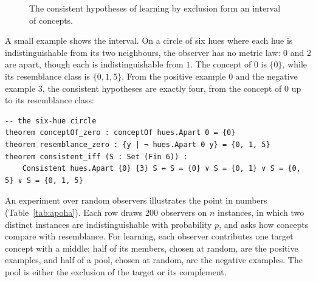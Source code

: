 \documentclass[11pt]{article}
\theoremstyle{plain}
\theoremstyle{definition}
\begin{document}
\begin{figure}[ht]
\centering
{}
\caption{The consistent hypotheses of learning by exclusion form an interval of concepts.}
\label{fig:apoha}
\end{figure}

\noindent A small example shows the interval. On a circle of six hues where each hue is
indistinguishable from its two neighbours, the observer has no metric law: $0$ and $2$ are
apart, though each is indistinguishable from $1$. The concept of $0$ is $\{0\}$, while its
resemblance class is $\{0,1,5\}$. From the positive example $0$ and the negative example $3$,
the consistent hypotheses are exactly four, from the concept of $0$ up to its resemblance
class:

\begin{lstlisting}
-- the six-hue circle
theorem conceptOf_zero : conceptOf hues.Apart 0 = {0}
theorem resemblance_zero : {y | ¬ hues.Apart 0 y} = {0, 1, 5}
theorem consistent_iff (S : Set (Fin 6)) :
    Consistent hues.Apart {0} {3} S ↔ S = {0} ∨ S = {0, 1} ∨ S = {0, 5} ∨ S = {0, 1, 5}
\end{lstlisting}

An experiment over random observers illustrates the point in numbers
(Table~\ref{tab:apoha}). Each row draws $200$ observers on $n$ instances, in which two
distinct instances are indistinguishable with probability $p$, and asks how concepts compare
with resemblance. For learning, each observer contributes one target concept with a middle;
half of its members, chosen at random, are the positive examples, and half of a pool, chosen
at random, are the negative examples. The pool is either the exclusion of the target or its
complement.
\end{document}
